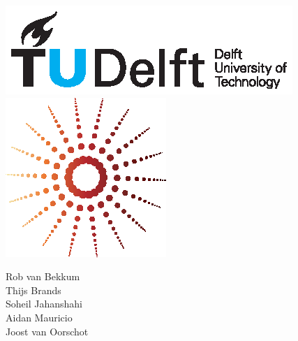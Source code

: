 \documentclass{article}
\begin{document}
\begin{figure}
    \begin{minipage}[H]{0.33\textwidth}
		\vspace{0.3cm}
		\includegraphics[scale=0.8]{images/TUDelftLogo.eps}
	\end{minipage}
	\begin{minipage}[H]{0.33\textwidth}
		\begin{center}
		\end{center}
		
		\begin{center}
			\includegraphics[scale=0.8]{images/Lg.eps}	
		
		\end{center}
	\end{minipage}
	\begin{minipage}[H]{0.33\textwidth}
			\begin{flushright}
				\small{Rob van Bekkum }\\
				\small{Thijs Brands }\\
				\small{Soheil Jahanshahi }\\
				\small{Aidan Mauricio }\\
				\small{Joost van Oorschot }
			\end{flushright}
			
	\end{minipage}
\end{figure}
\end{document}

